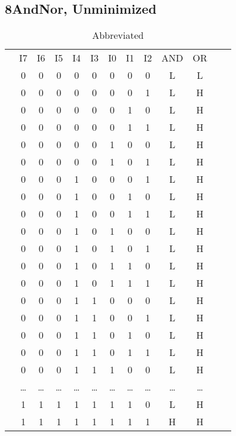 \documentclass[letterpaper,titlepage,oneside]{article}
\begin{document}
\pagebreak
\subsection*{8AndNor, Unminimized}
\begin{table}['h']
\begin{tabular}{c|c|c|c|c|c|c|c|c|c|c|c|c}
\cline{2-11}
& I7 & I6 & I5 & I4 & I3 & I0 & I1 & I2 & AND & OR & \\ 
\cline{2-11}
& 0 & 0 & 0 & 0 & 0 & 0 & 0 & 0 & L & L  \\  
& 0 & 0 & 0 & 0 & 0 & 0 & 0 & 1 & L & H \\
& 0 & 0 & 0 & 0 & 0 & 0 & 1 & 0 & L & H \\
& 0 & 0 & 0 & 0 & 0 & 0 & 1 & 1 & L & H \\
& 0 & 0 & 0 & 0 & 0 & 1 & 0 & 0 & L & H \\
& 0 & 0 & 0 & 0 & 0 & 1 & 0 & 1 & L & H \\ 
& 0 & 0 & 0 & 1 & 0 & 0 & 0 & 1 & L & H \\ 
& 0 & 0 & 0 & 1 & 0 & 0 & 1 & 0 & L & H \\
& 0 & 0 & 0 & 1 & 0 & 0 & 1 & 1 & L & H \\
& 0 & 0 & 0 & 1 & 0 & 1 & 0 & 0 & L & H \\
& 0 & 0 & 0 & 1 & 0 & 1 & 0 & 1 & L & H \\ 
& 0 & 0 & 0 & 1 & 0 & 1 & 1 & 0 & L & H \\ 
& 0 & 0 & 0 & 1 & 0 & 1 & 1 & 1 & L & H \\
& 0 & 0 & 0 & 1 & 1 & 0 & 0 & 0 & L & H \\
& 0 & 0 & 0 & 1 & 1 & 0 & 0 & 1 & L & H \\
& 0 & 0 & 0 & 1 & 1 & 0 & 1 & 0 & L & H \\
& 0 & 0 & 0 & 1 & 1 & 0 & 1 & 1 & L & H \\
& 0 & 0 & 0 & 1 & 1 & 1 & 0 & 0 & L & H \\
& \ldots{} & \ldots{} & \ldots{} & \ldots{} & \ldots{} & \ldots{} & %
\ldots{} & \ldots{} & \ldots{} & \ldots{}\\
& 1 & 1 & 1 & 1 & 1 & 1 & 1 & 0 & L & H \\
& 1 & 1 & 1 & 1 & 1 & 1 & 1 & 1 & H & H \\

\cline{2-11}


\end{tabular}
\caption{Abbreviated}\label{8AndNor_Unminimized}
\end{table}
\end{document}
